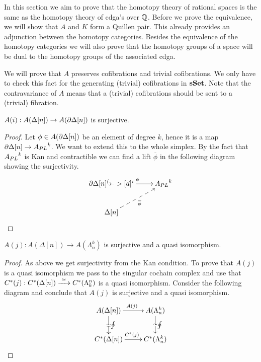 

In this section we aim to prove that the homotopy theory of rational spaces is the same as the homotopy theory of cdga's over $\mathbb{Q}$. Before we prove the equivalence, we will show that $A$ and $K$ form a Quillen pair. This already provides an adjunction between the homotopy categories. Besides the equivalence of the homotopy categories we will also prove that the homotopy groups of a space will be dual to the homotopy groups of the associated cdga.

We will prove that $A$ preserves cofibrations and trivial cofibrations. We only have to check this fact for the generating (trivial) cofibrations in $\mathbf{s{\mathbf{Set}}}$. Note that the contravariance of $A$ means that a (trivial) cofibrations should be sent to a (trivial) fibration.

\begin{lemma}
	$A(i) : A(\Delta[n]) \to A(\partial \Delta[n])$ is surjective.
\end{lemma}
\begin{proof}
	Let $\phi \in A(\partial \Delta[n])$ be an element of degree $k$, hence it is a map $\partial \Delta[n] \to {A_{PL}}^k$. We want to extend this to the whole simplex. By the fact that ${A_{PL}}^k$ is Kan and contractible we can find a lift $\overline{\phi}$ in the following diagram showing the surjectivity.
	\begin{displaymath}
		\xymatrix {
		\del \Delta[n] \ar[r]^\phi \arcof[d]^i & \Apl^k \\
		\Delta[n] \ar@{-->}[ru]_{\overline{\phi}}
		}
	\end{displaymath}
\end{proof}

\begin{lemma}
	$A(j) : A(\Delta[n]) \to A(\Lambda^k_n)$ is surjective and a quasi isomorphism.
\end{lemma}
\begin{proof}
	As above we get surjectivity from the Kan condition. To prove that $A(j)$ is a quasi isomorphism we pass to the singular cochain complex and use that $C^\ast(j) : C^\ast(\Delta[n]) \xrightarrow{\,\,{\simeq}\,\,} C^\ast(\Lambda^n_k)$ is a quasi isomorphism. Consider the following diagram and conclude that $A(j)$ is surjective and a quasi isomorphism.
	\begin{displaymath}
		\xymatrix {
		A(\Delta[n]) \ar[r]^{A(j)} \arwe[d]^\oint & A(\Lambda^k_n) \arwe[d]^\oint \\
		C^\ast(\Delta[n]) \ar[r]^{C^\ast(j)} & C^\ast(\Lambda^k_n)
		}
	\end{displaymath}
\end{proof}

